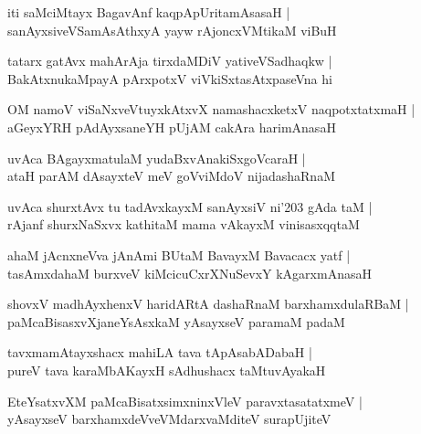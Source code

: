 \documentclass[twoside,12pt,openright]{book}
\newcounter{shloka}[chapter]
\begin{document}
\begin{shloka}%
iti saMciMtayx BagavAnf kaqpApUritamAsasaH |\\
sanAyxsiveVSamAsAthxyA yayw rAjoncxVMtikaM viBuH
\end{shloka}

\begin{shloka}%
tatarx gatAvx mahArAja tirxdaMDiV yativeVSadhaqkw |\\
BakAtxnukaMpayA pArxpotxV viVkiSxtasAtxpaseVna hi
\end{shloka}

\begin{shloka}%
OM namoV viSaNxveVtuyxkAtxvX namashacxketxV naqpotxtatxmaH |\\
aGeyxYRH pAdAyxsaneYH pUjAM cakAra harimAnasaH 
\end{shloka}

\begin{shloka}%
uvAca BAgayxmatulaM yudaBxvAnakiSxgoVcaraH |\\
ataH parAM dAsayxteV meV goVviMdoV nijadashaRnaM 
\end{shloka}

\begin{shloka}%
uvAca shurxtAvx tu tadAvxkayxM sanAyxsiV ni\char'203 gAda taM |\\
rAjanf shurxNaSxvx kathitaM mama vAkayxM vinisasxqqtaM 
\end{shloka}

\begin{shloka}%
ahaM jAcnxneVva jAnAmi BUtaM BavayxM Bavacacx  yatf |\\
tasAmxdahaM burxveV kiMcicuCxrXNuSevxY kAgarxmAnasaH 
\end{shloka}

\begin{shloka}%
shovxV madhAyxhenxV haridARtA dashaRnaM barxhamxdulaRBaM |\\
paMcaBisasxvXjaneYsAsxkaM yAsayxseV paramaM padaM 
\end{shloka}

\begin{shloka}%
tavxmamAtayxshacx mahiLA tava tApAsabADabaH |\\
pureV tava karaMbAKayxH sAdhushacx taMtuvAyakaH 
\end{shloka}

\begin{shloka}%
EteYsatxvXM paMcaBisatxsimxninxVleV paravxtasatatxmeV |\\
yAsayxseV barxhamxdeVveVMdarxvaMditeV surapUjiteV 
\end{shloka}
\end{document}
